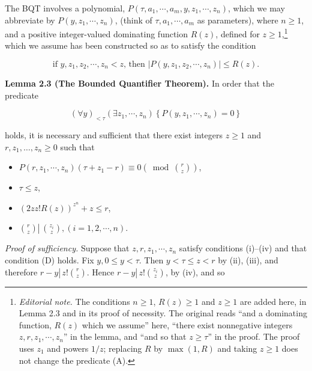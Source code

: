 \documentclass[11pt,a4paper]{article}
\newcommand{\origpage}[1]{\marginnote{\footnotesize\textbf{[#1]}}}
\newcommand{\ednote}[1]{\footnote{\textit{Editorial note.} #1}}
\begin{document}
The BQT involves a polynomial, $P\left(\tau, a_{1}, \cdots, a_{m}, y, z_{1}, \cdots, z_{n}\right)$, which we may abbreviate by $P\left(y, z_{1}, \cdots, z_{n}\right)$, (think of $\tau, a_{1}, \cdots, a_{m}$ as parameters), where $n\geq1$, and a positive integer-valued dominating function $R(z)$, defined for $z\geq1$,\ednote{The conditions $n\geq1$, $R(z)\geq1$ and $z\geq1$ are added here, in Lemma 2.3 and in its proof of necessity. The original reads ``and a dominating function, $R(z)$ which we assume'' here, ``there exist nonnegative integers $z,r,z_1,\cdots,z_n$'' in the lemma, and ``and so that $z\geq\tau$'' in the proof. The proof uses $z_1$ and powers $1/z$; replacing $R$ by $\max(1,R)$ and taking $z\geq1$ does not change the predicate (A).} which we assume has been constructed so as to satisfy the condition


\begin{equation*}
\text { if } y, z_{1}, z_{2}, \cdots, z_{n}<z \text {, then }\left|P\left(y, z_{1}, z_{2}, \cdots, z_{n}\right)\right| \leq R(z) \text {. } \tag{D}
\end{equation*}


\par{}\medskip\noindent\textbf{Lemma 2.3 (The Bounded Quantifier Theorem).} In order that the predicate


\begin{equation*}
(\forall y)_{<\tau}\left(\exists z_{1}, \cdots, z_{n}\right)\left\{P\left(y, z_{1}, \cdots, z_{n}\right)=0\right\} \tag{A}
\end{equation*}


holds, it is necessary and sufficient that there exist integers $z\geq1$ and $r,z_1,\ldots,z_n\geq0$ such that

\begin{samepage}\begin{itemize}
  \item[(i)] \origpage{341}$P\left(r, z_{1}, \cdots, z_{n}\right)\left(\tau+z_{1}-r\right) \equiv 0\left(\bmod \binom{r}{z}\right)$,
  \item[(ii)] $\tau \leq z$,
  \item[(iii)] $(2 z z!R(z))^{z^{n}}+z \leq r$,
  \item[(iv)] $\binom{r}{z} \left\lvert\,\binom{z_i}{z}\right.,(i=1,2, \cdots, n)$.
\end{itemize}\end{samepage}

\noindent\textit{Proof of sufficiency.} Suppose that $z, r, z_{1}, \cdots, z_{n}$ satisfy conditions (i)--(iv) and that condition (D) holds. Fix $y, 0 \leq y<\tau$. Then $y<\tau \leq z<r$ by (ii), (iii), and therefore $r-y \left\lvert\, z!\binom{r}{z}\right.$. Hence $r-y \left\lvert\, z!\binom{z_{i}}{z}\right.$, by (iv), and so
\end{document}
